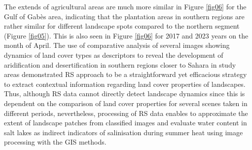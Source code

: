 \documentclass[environments,article,submit,pdftex,moreauthors]{Definitions/mdpi}
\begin{document}
The extends of agricultural areas are much more similar in Figure \ref{fig06} for the Gulf of Gabès area, indicating that the plantation areas in southern regions are rather similar for different landscape spots compared to the northern segment (Figure \ref{fig05}). This is also seen in Figure \ref{fig06} for 2017 and 2023 years on the month of April. The use of comparative analysis of several images showing dynamics of land cover types as descriptors to reveal the development of aridification and desertification in southern regions closer to Sahara in study areas demonstrated RS approach to be a straightforward yet efficacious strategy to extract contextual information regarding land cover properties of landscapes. Thus, although RS data cannot directly detect landscape dynamics since this is dependent on the comparison of land cover properties for several scenes taken in different periods, nevertheless, processing of RS data enables to approximate the extent of landscape patches from classified images and evaluate water content in salt lakes as indirect indicators of salinisation during summer heat using image processing with the GIS methods. 
\end{document}
